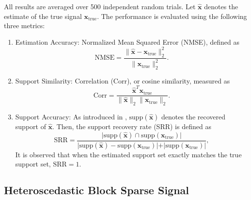 \documentclass[lettersize,journal]{IEEEtran}
\theoremstyle{remark}
\begin{document}
All results are averaged over 500 independent random trials. 
Let $\hat{\mathbf{x}}$ 
denotes the estimate of the true signal $\mathbf{x}_{\text{true}}$. The performance is evaluated using the following three metrics:
\begin{enumerate}
	\item[1.] Estimation Accuracy: Normalized Mean Squared Error (NMSE), defined as  
	\begin{equation*}
		\text{NMSE} = \frac{\|\hat{\mathbf{x}} - \mathbf{x}_{\text{true}}\|_2^2}{\|\mathbf{x}_{\text{true}}\|_2^2}.
	\end{equation*}
	\item [2.] Support Similarity: Correlation (Corr), or cosine similarity, measured as
		\begin{equation*}
		\text{Corr} = \frac{\hat{\mathbf{x}}^T \mathbf{x}_{\text{true}}}{\|\hat{\mathbf{x}}\|_2 \|\mathbf{x}_{\text{true}}\|_2}.
	\end{equation*}
	\item [3.] Support Accuracy: As introduced in \cite{wang2018alternative}\cite{sant2022block},  $\text{supp}(\hat{\mathbf{x}})$ denotes the recovered support of $\hat{\mathbf{x}}$. Then, the support recovery rate (SRR) is defined as
	\begin{equation*}
		\text{SRR} =\frac{\vert \text{supp}(\hat{\mathbf{x}})\cap \text{supp}(\mathbf{x}_{\text{true}})\vert }{\vert \text{supp}(\hat{\mathbf{x}})- \text{supp}(\mathbf{x}_{\text{true}})\vert+\vert \text{supp}(\mathbf{x}_{\text{true}})\vert },
	\end{equation*}
	It is observed that when the estimated support set exactly matches the true support set, $\text{SRR}= 1$.
\end{enumerate}

\subsection{Heteroscedastic Block Sparse Signal}\label{syn data}
\end{document}
